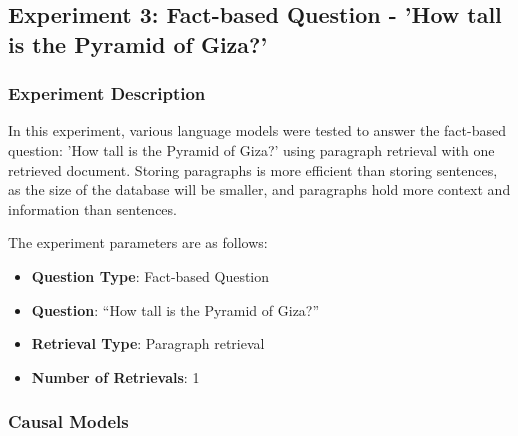 \documentclass{wseas}
\begin{document}
\subsection{Experiment 3: Fact-based Question - 'How tall is the Pyramid of Giza?'}

\subsubsection{Experiment Description}

In this experiment, various language models were tested to answer the
fact-based question: 'How tall is the Pyramid of Giza?' using paragraph
retrieval with one retrieved document. Storing paragraphs is more 
efficient than storing sentences, as the size of the database will
be smaller, and paragraphs hold more context and information than sentences.

The experiment parameters are as follows:

\begin{itemize}
\item
  \textbf{Question Type}: Fact-based Question
\item
  \textbf{Question}: ``How tall is the Pyramid of Giza?''
\item
  \textbf{Retrieval Type}: Paragraph retrieval
\item
  \textbf{Number of Retrievals}: 1
\end{itemize}

\subsubsection{Causal Models}
\end{document}
